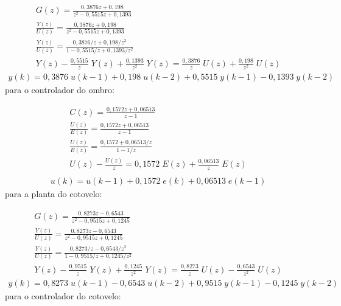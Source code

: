 \begin{equation*}
  \begin{gathered}
    G(z) = \frac{0,3876 z + 0,198}{z^2 - 0,5515 z + 0,1393} \\[0.5cm]
    \frac{Y(z)}{U(z)} = \frac{0,3876 z + 0,198}{z^2 - 0,5515 z + 0,1393}\\[0.5cm]
    \frac{Y(z)}{U(z)} = \frac{0,3876/z + 0,198/z^2}{1 - 0,5515/z + 0,1393/z^2}\\[0.5cm]
    Y(z) - \frac{0,5515}{z} \;Y(z) + \frac{0,1393}{z^2} \;Y(z) = \frac{0,3876}{z} \;U(z) + \frac{0,198}{z^2} \;U(z)
  \end{gathered}
  \label{eq:shouder_plant_diffEqIntro}
\end{equation*}
\begin{equation}
  \begin{gathered}
    y(k) = 0,3876 \;u(k-1) + 0,198 \;u(k-2) + 0,5515 \;y(k-1) - 0,1393 \;y(k-2)
  \end{gathered}
  \label{eq:shouder_plant_diffEq}
\end{equation}
para o controlador do ombro:

\begin{equation*}
  \begin{gathered}
    C(z) = \frac{0,1572 z + 0,06513}{z - 1}\\[0.5cm]
    \frac{U(z)}{E(z)} = \frac{0,1572 z + 0,06513}{z - 1}\\[0.5cm]
    \frac{U(z)}{E(z)} = \frac{0,1572 + 0,06513/z}{1 - 1/z}\\[0.5cm]
    U(z) - \frac{U(z)}{z} = 0,1572 \;E(z) + \frac{0,06513}{z}\;E(z)\\[0.5cm]
  \end{gathered}
  \label{eq:shouder_ctrl_diffEqIntro}
\end{equation*}
\begin{equation}
  \begin{gathered}
    u(k) = u(k-1) + 0,1572 \; e(k) + 0,06513 \;e(k-1)
  \end{gathered}
  \label{eq:shouder_ctrl_diffEq}
\end{equation}
para a planta do cotovelo:

\begin{equation*}
  \begin{gathered}
    G(z) = \frac{0,8273z - 0,6543}{z^2 - 0,9515z + 0,1245} \\[0.5cm]
    \frac{Y(z)}{U(z)} = \frac{0,8273z - 0,6543}{z^2 - 0,9515z + 0,1245}\\[0.5cm]
    \frac{Y(z)}{U(z)} = \frac{0,8273/z - 0,6543/z^2}{1 - 0,9515/z + 0,1245/z^2}\\[0.5cm]
    Y(z) - \frac{0,9515}{z} \;Y(z) + \frac{0,1245}{z^2} \;Y(z) = \frac{0,8273}{z} \;U(z) - \frac{0,6543}{z^2} \;U(z)
  \end{gathered}
  \label{eq:forearm_plant_diffEqIntro}
\end{equation*}
\begin{equation}
  \begin{gathered}
    y(k) = 0,8273 \;u(k-1) - 0,6543 \;u(k-2) + 0,9515 \;y(k-1) - 0,1245 \;y(k-2)
  \end{gathered}
  \label{eq:forearm_plant_diffEq}
\end{equation}
para o controlador do cotovelo:

